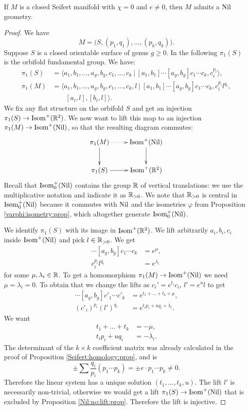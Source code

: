 \begin{prop} \label{Nil:construct:prop}
If $M$ is a closed Seifert manifold with $\chi=0$ and $e\neq 0$, then $M$ admits a ${\rm Nil}$ geometry.
\end{prop}
\begin{proof}
We have
$$ M = \big(S, (p_1,q_1), \ldots, (p_k, q_k) \big).$$
Suppose $S$ is a closed orientable surface of genus $g\geqslant 0$. In the following $\pi_1(S)$ is the orbifold fundamental group. We have:
\begin{align*}
\pi_1(S) & = \langle a_1, b_1, \ldots, a_g, b_g, c_1, \ldots, c_k \ |\ [a_1,b_1]\cdots [a_g,b_g] c_1 \cdots c_k, c_i^{p_i} \rangle, \\
\pi_1(M) & = \langle a_1, b_1, \ldots, a_g, b_g, c_1, \ldots, c_k, l \ |\ [a_1,b_1]\cdots [a_g,b_g] c_1 \cdots c_k, c_i^{p_i}l^{q_i}, \\ 
& \qquad [a_i,l], [b_i,l] \rangle. 
\end{align*}
We fix any flat structure on the orbifold $S$ and get an injection $\pi_1(S) \to{\rm Isom}^+(\mathbb{R}^2)$. We now want to lift this map to an injection $\pi_1(M) \to {\rm Isom}^+({\rm Nil})$, so that the resulting diagram commutes:
$$
\xymatrix{ 
\pi_1(M) \ar@{.>}[r] \ar[d] & \Iso^+(\Nil) \ar[d] \\
\pi_1(S)\ar[r] & \Iso^+(\matR^2)
}
$$
Recall that ${\rm Isom}_0^+({\rm Nil})$ contains the group $\mathbb{R}$ of vertical translations: we use the multiplicative notation and indicate it as $\mathbb{R}_{>0}$. We note that $\mathbb{R}_{>0}$ is central in ${\rm Isom}_0^+({\rm Nil})$ because it commutes with ${\rm Nil}$ and the isometries $\varphi$ from Proposition \ref{varphi:isometry:prop}, which altogether generate ${\rm Isom}_0^+({\rm Nil})$.

We identify $\pi_1(S)$ with its image in ${\rm Isom}^+(\mathbb{R}^2)$.
We lift arbitrarily $a_i,b_i,c_i$ inside ${\rm Isom}^+({\rm Nil})$ and pick $l\in \mathbb{R}_{>0}$. We get
\begin{align*}
[a_1,b_1]\cdots [a_g,b_g] c_1 \cdots c_k & = e^\mu, \\
c_i^{p_i}l^{q_i} & = e^{\lambda_i}
\end{align*}
for some $\mu, \lambda_i \in \mathbb{R}$. To get a homomorphism $\pi_1(M) \to {\rm Isom}^+({\rm Nil})$ we need $\mu = \lambda_i = 0$. To obtain that we change the lifts as $c_i' = e^{t_i} c_i$, $l' = e^u l$ to get
\begin{align*}
[a_1,b_1]\cdots [a_g,b_g] c'_1 \cdots c'_k & = e^{t_1 + \ldots + t_k + \mu}, \\
(c'_i)^{p_i}(l')^{q_i} & = e^{t_ip_i+ uq_i + \lambda_i}.
\end{align*}
We want
\begin{align*}
t_1+\ldots + t_k &= - \mu, \\
t_ip_i + uq_i &= - \lambda_i.
\end{align*}
The determinant of the $k\times k$ coefficient matrix was already calculated in the proof of Proposition \ref{Seifert:homology:prop}, and is
$$\pm\sum \frac{q_i}{p_i} (p_1\cdots p_k)= \pm e \cdot p_1\cdots p_k \neq 0.$$
Therefore the linear system has a unique solution $(t_1,\ldots, t_k, u)$. The lift $l'$ is necessarily non-trivial, otherwise we would get a lift $\pi_1(S) \to {\rm Isom}^+({\rm Nil})$ that is excluded by Proposition \ref{Nil:no:lift:prop}. Therefore the lift is injective.


\end{proof}
